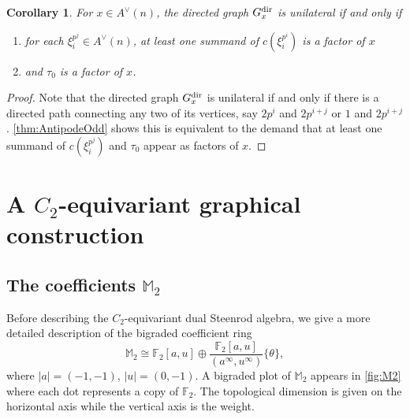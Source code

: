 \documentclass{amsart}
\newtheorem{cor}[theorem]{Corollary}
\theoremstyle{definition}
\theoremstyle{plain}
\numberwithin{theorem}{section}
\numberwithin{equation}{section}
\numberwithin{figure}{section}
\newcommand{\mF}{{\mathbb F}}
\newcommand{\mM}{{\mathbb M}}
\newcommand{\0}{\langle 0 \rangle }
\begin{document}
\begin{cor} \label{cor:unilateralityOdd}
    For $x \in A^\vee (n)$, the directed graph $G_x^{\textup{dir}}$ is unilateral if and only if
    \begin{enumerate}
        \item for each $\xi_i^{p^j} \in A^\vee (n)$, at least one summand of $c(\xi_i^{p^i})$ is a factor of $x$
        \item and $\tau_0$ is a factor of $x$.
    \end{enumerate}
\end{cor}

\begin{proof}
    Note that the directed graph $G_x^\textup{dir}$ is unilateral if and only if there is a directed path connecting any two of its vertices, say $2 p^{i}$ and $2 p^{ i + j}$ or $1$ and $2 p^{i + j}$. \cref{thm:AntipodeOdd} shows this is equivalent to the demand that at least one summand of $c(\xi_i^{p^j})$ and $\tau_0$ appear as factors of $x$. 
\end{proof}

\section{A $C_2$-equivariant graphical construction} \label{sec:C2}

\subsection{The coefficients $\mM_2$} \label{sec:M2} Before describing the $C_2$-equivariant dual Steenrod algebra, we give a more detailed description of the bigraded coefficient ring 
\[
\mM_2 \cong \mF_2[a,u] \oplus \frac{\mF_2[a,u]}{(a^\infty, u^\infty)} \{ \theta \},
\]
where $|a|=(-1,-1)$, $|u|=(0,-1)$. A bigraded plot of $\mM_2$ appears in \cref{fig:M2} where each dot represents a copy of $\mF_2$. The topological dimension is given on the horizontal axis while the vertical axis is the weight. 
\end{document}
